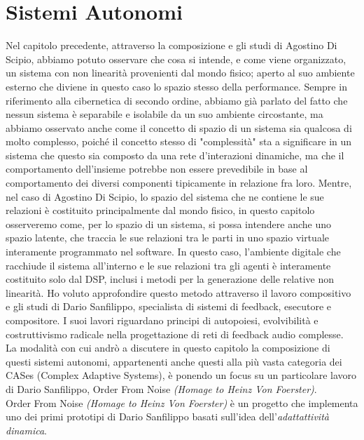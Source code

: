 \section{Sistemi Autonomi}
\label{sec:Sistemi Autonomi}

Nel capitolo precedente, attraverso la composizione e gli studi di Agostino Di Scipio, 
abbiamo potuto osservare che cosa si intende, e come viene organizzato, 
un sistema con non linearità provenienti dal mondo fisico; aperto al suo ambiente esterno 
che diviene in questo caso lo spazio stesso della performance.
Sempre in riferimento alla cibernetica di secondo ordine,
abbiamo già parlato del fatto che nessun sistema è separabile e 
isolabile da un suo ambiente circostante, 
ma abbiamo osservato anche come il concetto di spazio di un sistema sia 
qualcosa di molto complesso, poiché il concetto stesso di "complessità"
sta a significare in un sistema che questo sia composto da una rete d'interazioni dinamiche, 
ma che il comportamento dell'insieme potrebbe non essere prevedibile in base al comportamento 
dei diversi componenti tipicamente in relazione fra loro.
Mentre, nel caso di Agostino Di Scipio, lo spazio del sistema che ne contiene le sue relazioni 
è costituito principalmente dal mondo fisico, 
in questo capitolo osserveremo come, per lo spazio di un sistema, 
si possa intendere anche uno spazio latente, 
che traccia le sue relazioni tra le parti in uno spazio virtuale interamente programmato nel software. 
In questo caso, l'ambiente digitale che racchiude il sistema all'interno e le sue relazioni 
tra gli agenti è interamente costituito solo dal DSP, 
inclusi i metodi per la generazione delle relative non linearità.
Ho voluto approfondire questo metodo attraverso il lavoro compositivo e gli studi di Dario Sanfilippo, 
specialista di sistemi di feedback, esecutore e compositore. 
I suoi lavori riguardano principi di autopoiesi, evolvibilità e costruttivismo radicale nella progettazione 
di reti di feedback audio complesse. \\
La modalità con cui andrò a discutere in questo capitolo la composizione di questi
sistemi autonomi, appartenenti anche questi alla più vasta categoria dei CASes (Complex Adaptive Systems), 
è ponendo un focus su un particolare lavoro di Dario Sanfilippo, Order From Noise \textit{(Homage to Heinz Von Foerster)}. \\
Order From Noise \textit{(Homage to Heinz Von Foerster)} è un progetto che implementa uno 
dei primi prototipi di Dario Sanfilippo basati sull'idea dell'\textit{adattattività dinamica}. 
